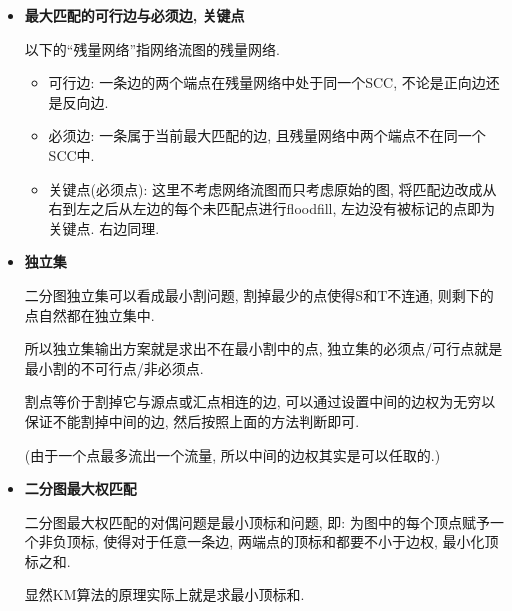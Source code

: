 \begin{itemize}

\item \textbf{最大匹配的可行边与必须边, 关键点}

以下的``残量网络''指网络流图的残量网络.

\begin{itemize}
	\item 可行边: 一条边的两个端点在残量网络中处于同一个SCC, 不论是正向边还是反向边.

	\item 必须边: 一条属于当前最大匹配的边, 且残量网络中两个端点不在同一个SCC中.
	
	\item 关键点(必须点): 这里不考虑网络流图而只考虑原始的图, 将匹配边改成从右到左之后从左边的每个未匹配点进行floodfill, 左边没有被标记的点即为关键点. 右边同理.
\end{itemize}

\item \textbf{独立集}

二分图独立集可以看成最小割问题, 割掉最少的点使得S和T不连通, 则剩下的点自然都在独立集中.

所以独立集输出方案就是求出不在最小割中的点, 独立集的必须点/可行点就是最小割的不可行点/非必须点.

割点等价于割掉它与源点或汇点相连的边, 可以通过设置中间的边权为无穷以保证不能割掉中间的边, 然后按照上面的方法判断即可.

(由于一个点最多流出一个流量, 所以中间的边权其实是可以任取的.)

\item \textbf{二分图最大权匹配}

二分图最大权匹配的对偶问题是最小顶标和问题, 即: 为图中的每个顶点赋予一个非负顶标, 使得对于任意一条边, 两端点的顶标和都要不小于边权, 最小化顶标之和.

显然KM算法的原理实际上就是求最小顶标和.

\end{itemize}